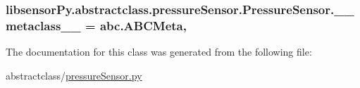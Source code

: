 \subsubsection[{\+\_\+\+\_\+metaclass\+\_\+\+\_\+}]{\setlength{\rightskip}{0pt plus 5cm}libsensor\+Py.\+abstractclass.\+pressure\+Sensor.\+Pressure\+Sensor.\+\_\+\+\_\+metaclass\+\_\+\+\_\+ = abc.\+A\+B\+C\+Meta\hspace{0.3cm}{\ttfamily [static]}, {\ttfamily [private]}}\label{classlibsensorPy_1_1abstractclass_1_1pressureSensor_1_1PressureSensor_ab0cfe51cd1c9eb77793409892719f9fa}


The documentation for this class was generated from the following file\+:\begin{DoxyCompactItemize}
\item 
abstractclass/\hyperlink{abstractclass_2pressureSensor_8py}{pressure\+Sensor.\+py}\end{DoxyCompactItemize}

